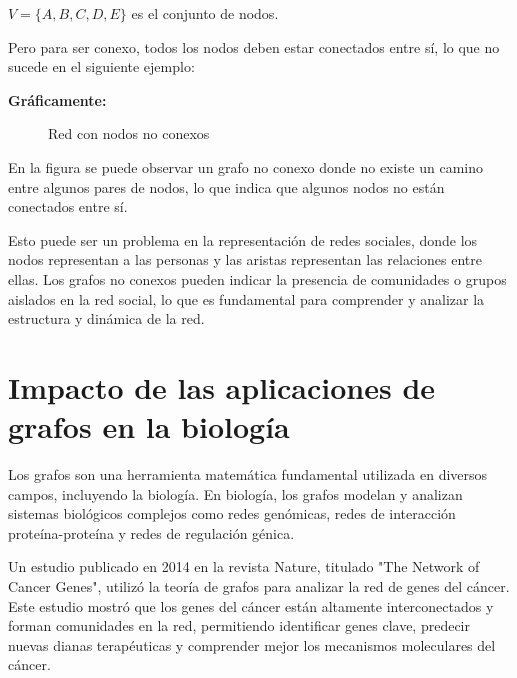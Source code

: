 \documentclass[11pt, a4paper]{article}
\begin{document}
\begin{enumerate}
$V = \{A, B, C, D, E\}$ es el conjunto de nodos.

Pero para ser conexo, todos los nodos deben estar conectados entre sí, lo que no sucede en el siguiente ejemplo:

\textbf{Gráficamente:}

\begin{figure}[H]
  \centering
  \caption{Red con nodos no conexos}
  \label{fig:red-no-conexa}
\end{figure}

En la figura se puede observar un grafo no conexo donde no existe un camino entre algunos pares de nodos, lo que indica que algunos nodos no están conectados entre sí.

Esto puede ser un problema en la representación de redes sociales, donde los nodos representan a las personas y las aristas representan las relaciones entre ellas. Los grafos no conexos pueden indicar la presencia de comunidades o grupos aislados en la red social, lo que es fundamental para comprender y analizar la estructura y dinámica de la red.

\end{enumerate}

\newpage

\section{Impacto de las aplicaciones de grafos en la biología}

Los grafos son una herramienta matemática fundamental utilizada en diversos campos, incluyendo la biología. En biología, los grafos modelan y analizan sistemas biológicos complejos como redes genómicas, redes de interacción proteína-proteína y redes de regulación génica.

Un estudio publicado en 2014 en la revista Nature, titulado "The Network of Cancer Genes", utilizó la teoría de grafos para analizar la red de genes del cáncer. Este estudio mostró que los genes del cáncer están altamente interconectados y forman comunidades en la red, permitiendo identificar genes clave, predecir nuevas dianas terapéuticas y comprender mejor los mecanismos moleculares del cáncer.
\end{document}
